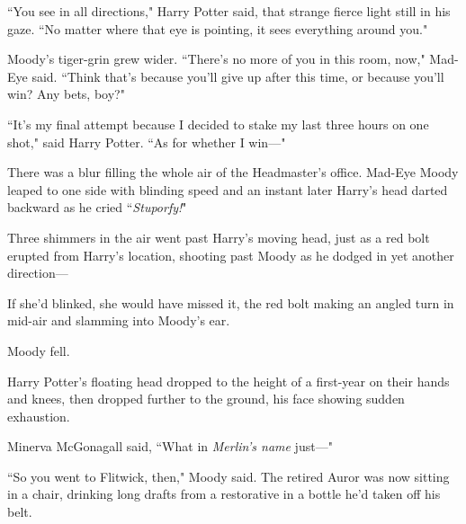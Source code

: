 ``You see in all directions," Harry Potter said, that strange fierce light still in his gaze. ``No matter where that eye is pointing, it sees everything around you."

Moody's tiger-grin grew wider. ``There's no more of you in this room, now," Mad-Eye said. ``Think that's because you'll give up after this time, or because you'll win? Any bets, boy?"

``It's my final attempt because I decided to stake my last three hours on one shot," said Harry Potter. ``As for whether I win—"

There was a blur filling the whole air of the Headmaster's office. Mad-Eye Moody leaped to one side with blinding speed and an instant later Harry's head darted backward as he cried ``\emph{Stuporfy!}"

Three shimmers in the air went past Harry's moving head, just as a red bolt erupted from Harry's location, shooting past Moody as he dodged in yet another direction—

If she'd blinked, she would have missed it, the red bolt making an angled turn in mid-air and slamming into Moody's ear.

Moody fell.

Harry Potter's floating head dropped to the height of a first-year on their hands and knees, then dropped further to the ground, his face showing sudden exhaustion.

Minerva McGonagall said, ``What in \emph{Merlin's name} just—"

\later

``So you went to Flitwick, then," Moody said. The retired Auror was now sitting in a chair, drinking long drafts from a restorative in a bottle he'd taken off his belt.

